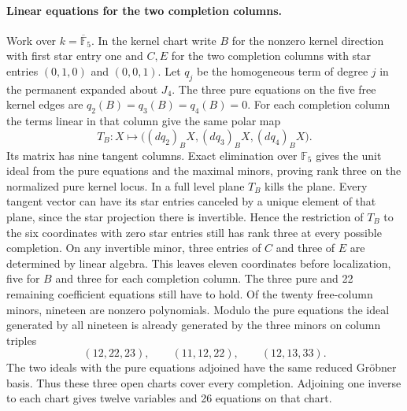 \paragraph{Linear equations for the two completion columns.}
Work over \(k=\overline{\mathbb F}_5\). In the kernel chart write \(B\)
for the nonzero kernel direction with first star entry one and \(C,E\)
for the two completion columns with star entries \((0,1,0)\) and
\((0,0,1)\). Let \(q_j\) be the homogeneous term of degree \(j\) in the
permanent expanded about \(J_4\). The three pure equations on the five
free kernel edges are \(q_2(B)=q_3(B)=q_4(B)=0\). For each completion
column the terms linear in that column give the same polar map
\[
  T_B:X\longmapsto
    \bigl((dq_2)_B X,(dq_3)_B X,(dq_4)_B X\bigr).
\]
Its matrix has nine tangent columns. Exact elimination over
\(\mathbb F_5\) gives the unit ideal from the pure equations and the
maximal minors, proving rank three on the normalized pure kernel locus.
In a full level plane \(T_B\) kills the plane. Every tangent vector
can have its star entries canceled by a unique element of that plane,
since the star projection there is invertible. Hence the restriction
of \(T_B\) to the six coordinates with zero star entries still has
rank three at every possible completion. On any invertible minor,
three entries of \(C\) and three of \(E\) are determined by linear
algebra. This leaves eleven coordinates before localization, five
for \(B\) and three for each completion column. The three pure and
22 remaining coefficient equations still have to hold. Of the twenty
free-column minors, nineteen are nonzero polynomials. Modulo the pure
equations the ideal generated by all nineteen is already generated by
the three minors on column triples
\[
 (12,22,23),\qquad (11,12,22),\qquad (12,13,33).
\]
The two ideals with the pure equations adjoined have the same reduced
Gr\"obner basis. Thus these three open charts cover every completion.
Adjoining one inverse to each chart gives twelve variables and
26 equations on that chart.

